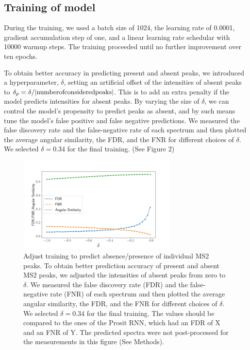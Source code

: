 \documentclass[10pt,a4paper]{article}
\begin{document}
\subsection*{Training of model}

During the training, we used a batch size of 1024, the learning rate of 0.0001, gradient accumulation step of one, and a linear learning rate schedular with 10000 warmup steps. The training proceeded until no further improvement over ten epochs.

To obtain better accuracy in predicting present and absent peaks, we introduced a hyperparameter, $\delta$, setting an artificial offset of the intensities of absent peaks to $\delta_p =\delta / |\rm{number of considered peaks}|$. This is to add an extra penalty if the model predicts intensities for absent peaks. By varying the size of $\delta$, we can control the model’s propensity to predict peaks as absent, and by such means tune the model’s false positive and false negative predictions. We measured the false discovery rate and the false-negative rate of each spectrum and then plotted the average angular similarity, the FDR, and the FNR for different choices of $\delta$. We selected $\delta=0.34$ for the final training. (See Figure 2)


\begin{figure}[htb]
\includegraphics[width=8cm]{./figures/compare_delta.png}
\caption{
Adjust training to predict absence/presence of individual MS2 peaks. To obtain better prediction accuracy of present and absent MS2 peaks, we adjusted the intensities of absent peaks from zero to $\delta$. We measured the false discovery rate (FDR) and the false-negative rate (FNR) of each spectrum and then plotted the average angular similarity, the FDR, and the FNR for different choices of $\delta$. We selected $\delta=0.34$ for the final training.  The values should be compared to the ones of the Prosit RNN, which had an FDR of X and an FNR of Y. The predicted spectra were not post-processed for the measurements in this figure (See Methods).}
\end{figure}
\end{document}
